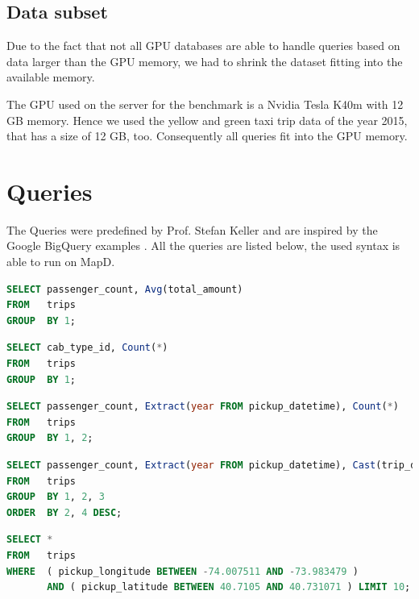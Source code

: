 \subsection{Data subset}
Due to the fact that not all GPU databases are able to handle queries based on data larger than the GPU memory,
we had to shrink the dataset fitting into the available memory.

The GPU used on the server for the benchmark is a Nvidia Tesla K40m with 12 GB memory.
Hence we used the yellow and green taxi trip data of the year 2015, that has a size of 12 GB, too.
Consequently all queries fit into the GPU memory.


\newpage
\section{Queries}
\label{sec:queries}
The Queries were predefined by Prof. Stefan Keller and are inspired by the Google BigQuery examples \cite{bigquery}.
All the queries are listed below, the used syntax is able to run on MapD. \\


\begin{lstlisting}[language=sql, caption={Query 1, Counts all the yellow taxi trips},captionpos=b]
SELECT passenger_count, Avg(total_amount)
FROM   trips
GROUP  BY 1;
\end{lstlisting}


\begin{lstlisting}[language=sql, caption={Query 2, Calculates the average passenger amount per trip},captionpos=b]
SELECT cab_type_id, Count(*)
FROM   trips
GROUP  BY 1;
\end{lstlisting}

\begin{lstlisting}[language=sql, caption={Query 3, Sums the yearly amount of passengers},captionpos=b]
SELECT passenger_count, Extract(year FROM pickup_datetime), Count(*)
FROM   trips
GROUP  BY 1, 2;
\end{lstlisting}


\begin{lstlisting}[language=sql, caption={Query 4, Groups the amount of passenger by year regarding the trip distance},captionpos=b]
SELECT passenger_count, Extract(year FROM pickup_datetime), Cast(trip_distance AS INT), Count(*)
FROM   trips
GROUP  BY 1, 2, 3
ORDER  BY 2, 4 DESC;
\end{lstlisting}

\begin{lstlisting}[language=sql, caption={Query 5, Queries all trips in a certain bounding box},captionpos=b]
SELECT *
FROM   trips
WHERE  ( pickup_longitude BETWEEN -74.007511 AND -73.983479 )
       AND ( pickup_latitude BETWEEN 40.7105 AND 40.731071 ) LIMIT 10;
\end{lstlisting}


